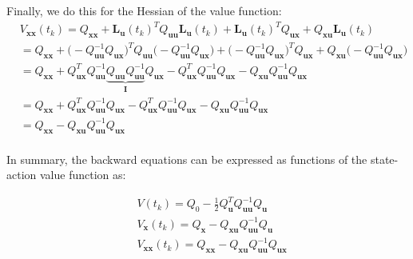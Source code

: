 \documentclass[11pt]{homework}
\renewcommand{\vec}[1]{\ensuremath{\boldsymbol{#1}}}
\begin{document}
\begin{arabicparts}
		Finally, we do this for the Hessian of the value function: 
			\begin{align*}
				& V_{\vec{xx}}(t_{k}) = Q_{\vec{xx}} + \vec{L}_{\vec{u}}(t_{k})^{T}Q_{\vec{uu}}\vec{L}_{\vec{u}}(t_{k}) + \vec{L}_{\vec{u}}(t_{k})^{T}Q_{\vec{ux}} + Q_{\vec{xu}}\vec{L}_{\vec{u}}(t_{k})  \\
				& = Q_{\vec{xx}} + \Big(-Q_{\vec{uu}}^{-1}Q_{\vec{ux}} \Big)^{T}Q_{\vec{uu}}\Big(-Q_{\vec{uu}}^{-1}Q_{\vec{ux}} \Big) + \Big(-Q_{\vec{uu}}^{-1}Q_{\vec{ux}} \Big)^{T}Q_{\vec{ux}} + Q_{\vec{xu}}\Big(-Q_{\vec{uu}}^{-1}Q_{\vec{ux}} \Big) \\
				& = Q_{\vec{xx}} + Q_{\vec{ux}}^{T}Q_{\vec{uu}}^{-1}\underbrace{Q_{\vec{uu}}Q_{\vec{uu}}^{-1}}_{\vec{I}}Q_{\vec{ux}}  - Q_{\vec{ux}}^{T}Q_{\vec{uu}}^{-1}Q_{\vec{ux}} - Q_{\vec{xu}}Q_{\vec{uu}}^{-1}Q_{\vec{ux}} \\
				& = Q_{\vec{xx}} + Q_{\vec{ux}}^{T}Q_{\vec{uu}}^{-1}Q_{\vec{ux}}  - Q_{\vec{ux}}^{T}Q_{\vec{uu}}^{-1}Q_{\vec{ux}} - Q_{\vec{xu}}Q_{\vec{uu}}^{-1}Q_{\vec{ux}} \\
				& = Q_{\vec{xx}} - Q_{\vec{xu}}Q_{\vec{uu}}^{-1}Q_{\vec{ux}}\\
			\end{align*}		
		
	\end{arabicparts}

		In summary, the backward equations can be expressed as functions of the state-action value function as: 

			\begin{align*}
				& V(t_k) = Q_{0} - \frac{1}{2}Q_{\vec{u}}^{T}Q_{\vec{uu}}^{-1}Q_{\vec{u}} \\
				& V_{\vec{x}}(t_{k}) = Q_{\vec{x}} - Q_{\vec{xu}}Q_{\vec{uu}}^{-1}Q_{\vec{u}} \\
				& V_{\vec{xx}}(t_{k}) = Q_{\vec{xx}} - Q_{\vec{xu}}Q_{\vec{uu}}^{-1}Q_{\vec{ux}} \\
			\end{align*}

	\newpage
\end{document}
